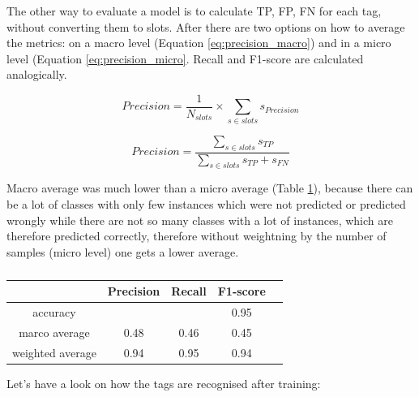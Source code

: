 \documentclass[12pt,titlepage,a4paper]{article}
\begin{document}
The other way to evaluate a model is to calculate TP, FP, FN for each tag, without converting them to slots. After there are two options on how to average the metrics: on a macro level (Equation \ref{eq:precision_macro}) and in a micro level (Equation \ref{eq:precision_micro}. Recall and F1-score are calculated analogically.

\begin{equation}
    Precision = \frac{1}{N_{slots}} \times \sum_{s \in slots}{s_{Precision}}
    \label{eq:precision_macro}
\end{equation}

\begin{equation}
    Precision = \frac{\sum_{s \in slots}{s_{TP}}}{\sum_{s \in slots}{s_{TP} + s_{FN}}}
    \label{eq:precision_micro}
\end{equation}

Macro average was much lower than a micro average (Table \ref{RNNMetrics}), because there can be a lot of classes with only few instances which were not predicted or predicted wrongly while there are not so many classes with a lot of instances, which are therefore predicted correctly, therefore without weight\-ning by the number of samples (micro level) one gets a lower average.

\begin{table}[!h]
    \centering
    \begin{tabular}{ | c | c | c | c | c |}
        \hline
                        & Precision & Recall & F1-score \\
        \hline
        accuracy        &           &        & 0.95 \\
        \hline
        marco average   & 0.48      & 0.46   & 0.45 \\
        \hline
        weighted average& 0.94      & 0.95   & 0.94 \\
        \hline
    \end{tabular}
    \caption{}
    \label{RNNMetrics}
\end{table}

Let's have a look on how the tags are recognised after training: 
\begin{center}
\end{center}
\end{document}

